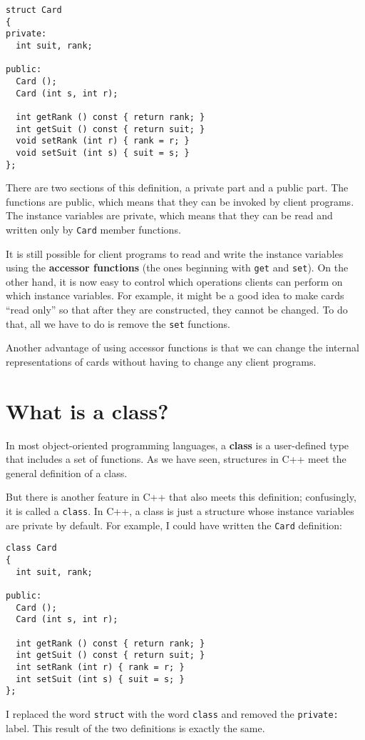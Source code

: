 \begin{verbatim}
struct Card
{
private:
  int suit, rank;

public:
  Card ();
  Card (int s, int r);

  int getRank () const { return rank; }
  int getSuit () const { return suit; }
  void setRank (int r) { rank = r; }
  void setSuit (int s) { suit = s; }
};
\end{verbatim}
%
There are two sections of this definition, a private part and
a public part.  The functions are public, which means that they
can be invoked by client programs.  The instance variables are
private, which means that they can be read and written only by
{\tt Card} member functions.


It is still possible for client programs to read and
write the instance variables using the {\bf accessor functions}
(the ones beginning with {\tt get} and {\tt set}).
On the other hand, it is now easy to control which
operations clients can perform on which instance variables.
For example, it might be a good idea to make cards ``read only''
so that after they are constructed, they cannot be changed.
To do that, all we have to do is remove the {\tt set} functions.

Another advantage of using accessor functions is that we
can change the internal representations of cards without
having to change any client programs.

\section{What is a class?}

In most object-oriented programming languages, a {\bf class} is
a user-defined type that includes a set of functions.  As
we have seen, structures in C++ meet the general definition of
a class.

But there is another feature in C++ that also meets this definition;
confusingly, it is called a {\tt class}.  In C++, a class
is just a structure whose instance variables are private by
default.  For example, I could have written the {\tt Card}
definition:

\begin{verbatim}
class Card
{
  int suit, rank;

public:
  Card ();
  Card (int s, int r);

  int getRank () const { return rank; }
  int getSuit () const { return suit; }
  int setRank (int r) { rank = r; }
  int setSuit (int s) { suit = s; }
};
\end{verbatim}
%
I replaced the word {\tt struct} with the word {\tt class} and
removed the {\tt private:} label.  This result of the two definitions
is exactly the same.

